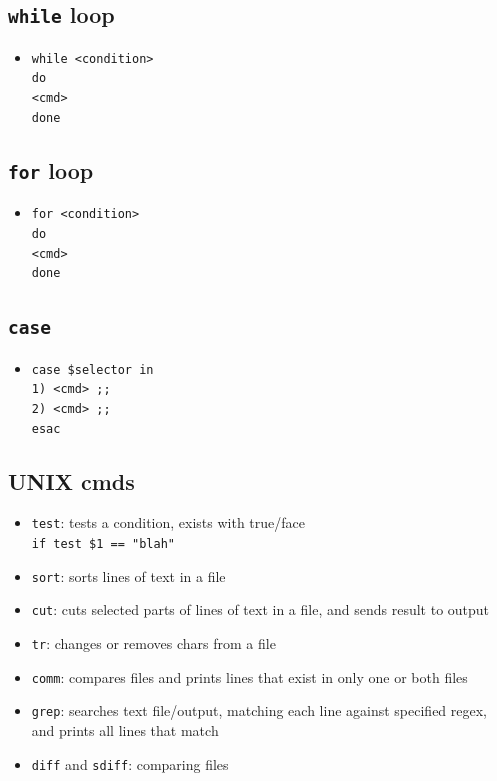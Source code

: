 \documentclass[10pt, multicolumn, a4paper]{article}
\begin{document}
\begin{multicols}{2}
	\subsection*{\texttt{while} loop}
	\begin{itemize}
	\item \texttt{while <condition> \\ do \\ \hspace*{5mm} <cmd> \\ done}
	\end{itemize}
	\subsection*{\texttt{for} loop}
	\begin{itemize}
	\item \texttt{for <condition> \\ do \\ \hspace*{5mm} <cmd> \\ done}
	\end{itemize}
	\subsection*{\texttt{case}}
	\begin{itemize}
	\item \texttt{case \$selector in \\ 1) <cmd> ;; \\ 2) <cmd> ;; \\ esac}
	\end{itemize}
	\subsection*{UNIX cmds}
	\begin{itemize}
	\item \texttt{test}: tests a condition, exists with true/face
		\\ \texttt{if test \$1 == "blah"}
	\item \texttt{sort}: sorts lines of text in a file
	\item \texttt{cut}: cuts selected parts of lines of text in a file, and sends result to output
	\item \texttt{tr}: changes or removes chars from a file
	\item \texttt{comm}: compares files and prints lines that exist in only one or both files
	\item \texttt{grep}: searches text file/output, matching each line against specified regex, and prints all lines that match
	\item \verb|diff| and \verb|sdiff|: comparing files
	\end{itemize}

\end{multicols}
\end{document}
